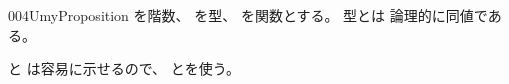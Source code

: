 \documentclass[index]{subfiles}
\begin{document}
\begin{myBlock}{004U}{myProposition}
  を階数、
  を型、
  を関数とする。
  型とは
  論理的に同値である。
\end{myBlock}
\begin{myProof}
  と
  は容易に示せるので、
  とを使う。
\end{myProof}
\end{document}
